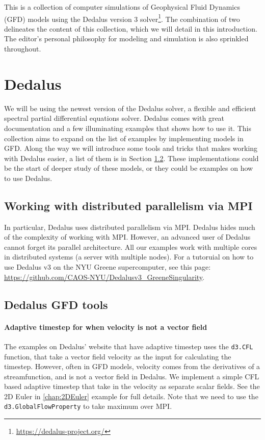 This is a collection of computer simulations of Geophysical Fluid Dynamics (GFD) models using the Dedalus version 3 solver\footnote{\url{https://dedalus-project.org/}}. The combination of two delineates the content of this collection, which we will detail in this introduction. The editor's personal philosophy for modeling and simulation is also sprinkled throughout. 

\section{Dedalus}
We will be using the newest version of the Dedalus solver, a flexible and efficient spectral partial differential equations solver. Dedalus comes with great documentation and a few illuminating examples that shows how to use it. This collection aims to expand on the list of examples by implementing models in GFD. Along the way we will introduce some tools and tricks that makes working with Dedalus easier, a list of them is in Section \ref{sec:Ded_tools}. These implementations could be the start of deeper study of these models, or they could be examples on how to use Dedalus. 

\subsection{Working with distributed parallelism via MPI}
In particular, Dedalus uses distributed parallelism via MPI. Dedalus hides much of the complexity of working with MPI. However, an advanced user of Dedalus cannot forget its parallel architecture. All our examples work with multiple cores in distributed systems (a server with multiple nodes). For a tutoruial on how to use Dedalus v3 on the NYU Greene supercomputer, see this page: \url{https://github.com/CAOS-NYU/Dedalusv3_GreeneSingularity}.

\subsection{Dedalus GFD tools}\label{sec:Ded_tools}
\paragraph{Adaptive timestep for when velocity is not a vector field}
The examples on Dedalus' website that have adaptive timestep uses the \texttt{d3.CFL} function, that take a vector field velocity as the input for calculating the timestep. However, often in GFD models, velocity comes from the derivatives of a streamfunction, and is not a vector field in Dedalus. We implement a simple CFL based adaptive timestep that take in the velocity as separate scalar fields. See the 2D Euler in \ref{chap:2DEuler} example for full details. Note that we need to use the \texttt{d3.GlobalFlowProperty} to take maximum over MPI.

